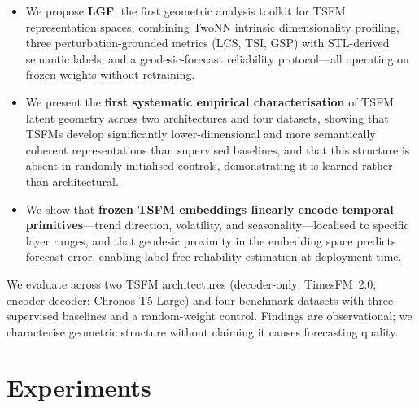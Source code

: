 \documentclass[letterpaper,twocolumn]{article}
\newcommand{\lcs}{\ensuremath{\mathrm{LCS}}}
\newcommand{\tsi}{\ensuremath{\mathrm{TSI}}}
\newcommand{\gsp}{\ensuremath{\mathrm{GSP}}}
\begin{document}
\begin{itemize}
  \item We propose \textbf{LGF}, the first geometric analysis toolkit for TSFM
        representation spaces, combining TwoNN intrinsic dimensionality profiling,
        three perturbation-grounded metrics (\lcs, \tsi, \gsp) with STL-derived
        semantic labels, and a geodesic-forecast reliability protocol---all
        operating on frozen weights without retraining.

  \item We present the \textbf{first systematic empirical characterisation} of TSFM
        latent geometry across two architectures and four datasets, showing that
        TSFMs develop significantly lower-dimensional and more semantically coherent
        representations than supervised baselines, and that this structure is absent
        in randomly-initialised controls, demonstrating it is learned rather than
        architectural.

  \item We show that \textbf{frozen TSFM embeddings linearly encode temporal
        primitives}---trend direction, volatility, and seasonality---localised to
        specific layer ranges, and that geodesic proximity in the embedding space
        predicts forecast error, enabling label-free reliability estimation at
        deployment time.
\end{itemize}

We evaluate across two TSFM architectures (decoder-only: TimesFM~2.0;
encoder-decoder: Chronos-T5-Large) and four benchmark datasets with three
supervised baselines and a random-weight control.
Findings are observational; we characterise geometric structure without claiming
it causes forecasting quality.





\section{Experiments}
\label{sec:experiments}
\end{document}
